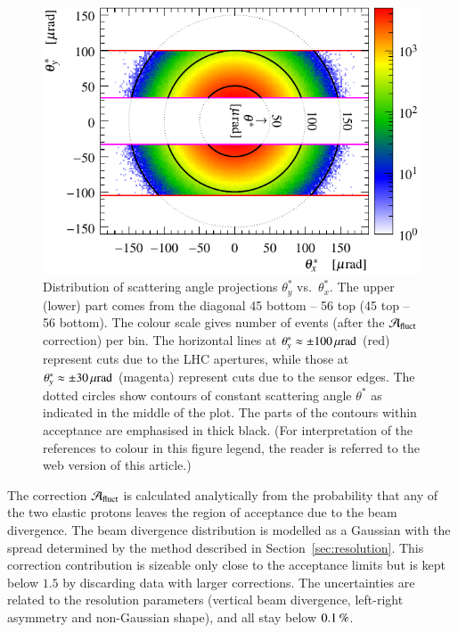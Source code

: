 \begin{figure}
\begin{center}
\includegraphics{fig/acc_corr_phi_lab.pdf}
\vskip-3mm
\caption{%
Distribution of scattering angle projections $\theta_y^*$ vs.~$\theta_x^*$. The upper (lower) part comes from the diagonal 45 bottom -- 56 top (45 top -- 56 bottom). The colour scale gives number of events (after the ${\cal A}_{\rm fluct}$ correction) per bin. The horizontal lines at $\theta_y^* \approx \pm 100\,{\rm \mu rad}$ (red) represent cuts due to the LHC apertures, while those at $\theta_y^* \approx \pm 30 \,{\rm \mu rad}$ (magenta) represent cuts due to the sensor edges. The dotted circles show contours of constant scattering angle $\theta^*$ as indicated in the middle of the plot. The parts of the contours within acceptance are emphasised in thick black. (For interpretation of the references to colour in this figure legend, the reader is referred to the web version of this article.)
}
\label{fig:acceptance principle}
\end{center}
\end{figure}


The correction ${\cal A}_{\rm fluct}$ is calculated analytically from the probability that any of the two elastic protons leaves the region of acceptance due to the beam divergence. The beam divergence distribution is modelled as a Gaussian with the spread determined by the method described in Section~\ref{sec:resolution}. This correction contribution is sizeable only close to the acceptance limits but is kept below $1.5$ by discarding data with larger corrections. The uncertainties are related to the resolution parameters (vertical beam divergence, left-right asymmetry and non-Gaussian shape), and all stay below $0.1\,{\rm \%}$.


